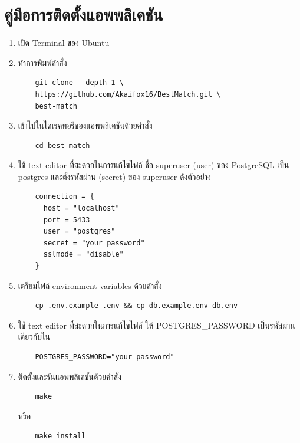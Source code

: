 \section{คู่มือการติดตั้งแอพพลิเคชัน}
\begin{enumerate}
  \item เปิด Terminal ของ Ubuntu
  \item ทำการพิมพ์คำสั่ง 
  \begin{verbatim}
    git clone --depth 1 \
    https://github.com/Akaifox16/BestMatch.git \
    best-match
  \end{verbatim}
  \item เข้าไปในไดเรคทอรีของแอพพลิเคชันด้วยคำสั่ง 
  \begin{verbatim}
    cd best-match
  \end{verbatim}
  \item ใช้ text editor ที่สะดวกในการแก้ไขไฟล์ 
  ชื่อ superuser (user) ของ PostgreSQL เป็น postgres และตั้งรหัสผ่าน (secret) ของ superuser ดังตัวอย่าง
  \begin{verbatim}
    connection = {
      host = "localhost"
      port = 5433
      user = "postgres"
      secret = "your password"
      sslmode = "disable"
    }
  \end{verbatim}
  \item เตรียมไฟล์ environment variables ด้วยคำสั่ง
  \begin{verbatim}
    cp .env.example .env && cp db.example.env db.env
  \end{verbatim}
  \item ใช้ text editor ที่สะดวกในการแก้ไขไฟล์  
  ให้ POSTGRES\_PASSWORD เป็นรหัสผ่านเดียวกับใน 
  \begin{verbatim}
    POSTGRES_PASSWORD="your password"
  \end{verbatim}
  \item ติดตั้งและรันแอพพลิเคชันด้วยคำสั่ง 
  \begin{verbatim}
    make
  \end{verbatim}
  หรือ
  \begin{verbatim}
    make install
  \end{verbatim}
\end{enumerate}
%
